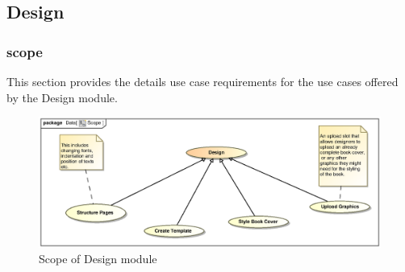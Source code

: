 \clearpage
\subsection{Design}

\subsubsection{scope}
\par{This section provides the details use case requirements for the use cases offered by the Design
module.}

\begin{figure}[h]
\includegraphics[scale=0.5]{epsImages/Design/Scope.eps}
\caption{Scope of Design module}
\end{figure}

